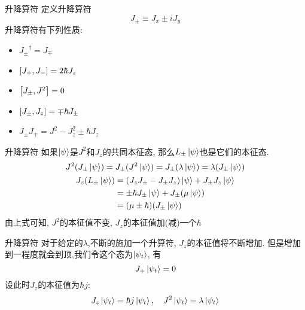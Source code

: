 \documentclass{beamer}
\begin{document}
\begin{frame}{升降算符}
定义升降算符
\begin{equation}
J_{\pm} \equiv J_x \pm i J_y
\end{equation}
升降算符有下列性质:
\begin{itemize}
\item ${J_\pm}^\dag = J_\mp$
\item $\comm{J_+}{J_-} = 2 \hbar J_z$
\item $\comm{J_\pm}{J^2} = 0$
\item $\comm{J_\pm}{J_z} = \mp \hbar J_\pm$
\item $J_\pm J_\mp = J^2 - J_z^2 \pm \hbar J_z$
\end{itemize}
\end{frame}

\begin{frame}{升降算符}
如果$\ket{\psi}$是$J^2$和$J_z$的共同本征态, 那么$L_\pm \ket{\psi}$也是它们的本征态.
\begin{gather}
J^2(J_\pm \ket{\psi}) = J_\pm (J^2 \ket{\psi}) = J_\pm  (\lambda \ket{\psi}) = \lambda (J_\pm \ket{\psi}) \\
\begin{split}
J_z (L_\pm \ket{\psi}) &= (J_z J_\pm - J_\pm J_z) \ket{\psi} + J_\pm J_z \ket{\psi} \\
  &= \pm \hbar J_\pm \ket{\psi} + J_\pm (\mu \ket{\psi}) \\
  &= (\mu \pm \hbar) (J_\pm \ket{\psi})
\end{split}
\end{gather}
由上式可知, $J^2$的本征值不变, $J_z$的本征值加(减)一个$\hbar$
\end{frame}

\begin{frame}{升降算符}
对于给定的$\lambda$,不断的施加一个升算符, $J_z$的本征值将不断增加. 但是增加到一程度就会到顶,我们令这个态为$\ket{\psi_t}$, 有
\begin{equation}
J_+ \ket{\psi_t} = 0
\end{equation}
设此时$J_z$的本征值为$\hbar j$:
\begin{equation}
J_z \ket{\psi_t} = \hbar j \ket{\psi_t}, \quad J^2 \ket{\psi_t} = \lambda \ket{\psi_t}
\end{equation}
\end{frame}
\end{document}

